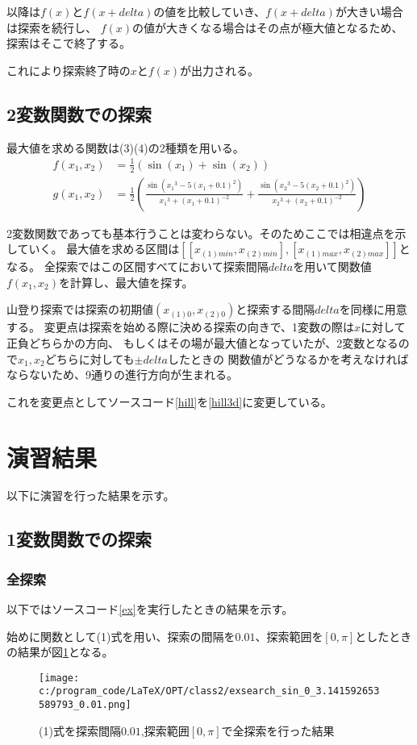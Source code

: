 \documentclass[a4paper,11pt,dvipdfmx]{jsarticle}
\begin{document}
以降は$f(x)$と$f(x+delta)$の値を比較していき、$f(x+delta)$が大きい場合は探索を続行し、
$f(x)$の値が大きくなる場合はその点が極大値となるため、探索はそこで終了する。

これにより探索終了時の$x$と$f(x)$が出力される。

\subsection{2変数関数での探索}
最大値を求める関数は(3)(4)の2種類を用いる。
\begin{align}
    f(x_1,x_2) &= \frac{1}{2} (\sin(x_1) + \sin(x_2))\\
    g(x_1,x_2) &= \frac{1}{2} \left( \frac{\sin({x_1}^3-5(x_1+0.1)^2)}{{x_1}^3+(x_1+0.1)^{-2}} + \frac{\sin({x_2}^3-5(x_2+0.1)^2)}{{x_2}^3+(x_2+0.1)^{-2}} \right)
\end{align}

2変数関数であっても基本行うことは変わらない。そのためここでは相違点を示していく。
最大値を求める区間は$[[x_{(1)min},x_{(2)min}],[x_{(1)max},x_{(2)max}]]$となる。
全探索ではこの区間すべてにおいて探索間隔$delta$を用いて関数値$f(x_1,x_2)$を計算し、最大値を探す。

山登り探索では探索の初期値$(x_{(1)0},x_{(2)0})$と探索する間隔$delta$を同様に用意する。
変更点は探索を始める際に決める探索の向きで、1変数の際は$x$に対して正負どちらかの方向、
もしくはその場が最大値となっていたが、2変数となるので$x_1,x_2$どちらに対しても$\pm delta$したときの
関数値がどうなるかを考えなければならないため、9通りの進行方向が生まれる。

これを変更点としてソースコード\ref{hill}を\ref{hill3d}に変更している。

\section{演習結果}
以下に演習を行った結果を示す。
\subsection{1変数関数での探索}
\subsubsection{全探索}
以下ではソースコード\ref{ex}を実行したときの結果を示す。

始めに関数として(1)式を用い、探索の間隔を$0.01$、探索範囲を$[0,\pi]$としたときの結果が図\ref{es0p0.01}となる。
\begin{figure}[h]
    \centering
    \texttt{[image: c:/program\_code/LaTeX/OPT/class2/exsearch\_sin\_0\_3.141592653589793\_0.01.png]}
    \caption{(1)式を探索間隔$0.01$,探索範囲$[0,\pi]$で全探索を行った結果}
    \label{es0p0.01}
\end{figure}
\end{document}
